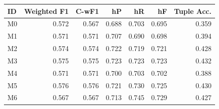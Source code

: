 \begin{tabular}{lrrrrrr}
\toprule
ID & Weighted F1 & C-wF1 & hP & hR & hF & Tuple Acc. \\
\midrule
M0 & 0.572 & 0.567 & 0.688 & 0.703 & 0.695 & 0.359 \\
M1 & 0.571 & 0.571 & 0.707 & 0.690 & 0.698 & 0.394 \\
M2 & 0.574 & 0.574 & 0.722 & 0.719 & 0.721 & 0.428 \\
M3 & 0.575 & 0.575 & 0.723 & 0.723 & 0.723 & 0.432 \\
M4 & 0.571 & 0.571 & 0.700 & 0.703 & 0.702 & 0.388 \\
M5 & 0.576 & 0.576 & 0.721 & 0.730 & 0.725 & 0.430 \\
M6 & 0.567 & 0.567 & 0.713 & 0.745 & 0.729 & 0.427 \\
\bottomrule
\end{tabular}

